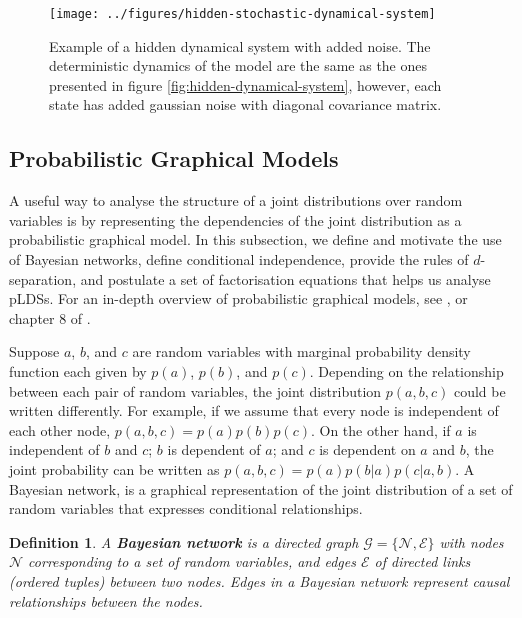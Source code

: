 \documentclass[11pt]{article}
\numberwithin{equation}{section}
\newtheorem{definition}{Definition}[section]
\begin{document}
\begin{figure}[h!]
	\centering
	\texttt{[image: ../figures/hidden-stochastic-dynamical-system]}
	\caption{Example of a hidden dynamical system with added noise. The deterministic dynamics of the model are the same as the ones presented in figure \ref{fig:hidden-dynamical-system}, however, each state has added gaussian noise with diagonal covariance matrix.}
	\label{fig:hidden-noisy-dynamical-system}
\end{figure}


\subsection{Probabilistic Graphical Models}
A useful way to analyse the structure of a joint distributions over random variables is by representing the dependencies of the joint distribution as a probabilistic graphical model. In this subsection, we define and motivate the use of Bayesian networks, define conditional independence, provide the rules of $d$-separation, and postulate a set of factorisation equations that helps us analyse pLDSs. For an in-depth overview of probabilistic graphical models, see \cite{koller2009}, or chapter 8 of \cite{prml}.

Suppose $a$, $b$, and $c$ are random variables with marginal probability density function each given by $p(a)$, $p(b)$, and $p(c)$. Depending on the relationship between each pair of random variables, the joint distribution $p(a,b,c)$ could be written differently. For example, if we assume that every node is independent of each other node, $p(a,b,c) = p(a) p(b) p(c)$. On the other hand, if $a$ is independent of $b$ and $c$; $b$ is dependent of $a$; and $c$ is dependent on $a$ and $b$, the joint probability can be written as $p(a,b,c) = p(a) p(b \vert a) p(c \vert a, b)$. A Bayesian network, is a graphical representation of the joint distribution of a set of random variables that expresses conditional relationships.

\begin{definition}
	A \textbf{Bayesian network} is a directed graph $\mathcal G = \{\mathscr{N}, \mathscr{E}\}$ with nodes $\mathscr{N}$ corresponding to a set of random variables, and edges $\mathscr{E}$ of directed links (ordered tuples) between two nodes. Edges in a Bayesian network represent causal relationships between the nodes.
\end{definition}
\end{document}
